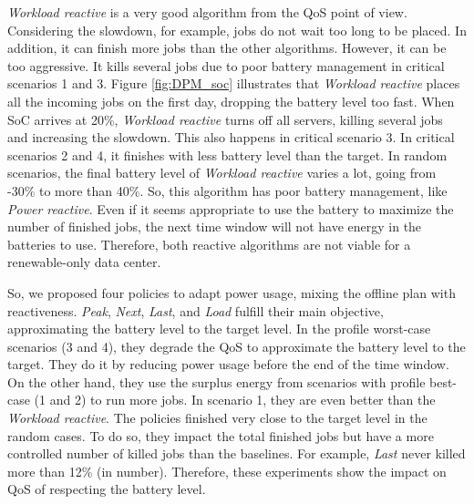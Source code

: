 \emph{Workload reactive} is a very good algorithm from the QoS point of view. Considering the slowdown, for example, jobs do not wait too long to be placed. In addition, it can finish more jobs than the other algorithms. However, it can be too aggressive. It kills several jobs due to poor battery management in critical scenarios 1 and 3. Figure \ref{fig:DPM_soc} illustrates that \emph{Workload reactive} places all the incoming jobs on the first day, dropping the battery level too fast. When SoC arrives at 20\%, \emph{Workload reactive} turns off all servers, killing several jobs and increasing the slowdown. This also happens in critical scenario 3. In critical scenarios 2 and 4, it finishes with less battery level than the target. In random scenarios, the final battery level of \emph{Workload reactive} varies a lot, going from -30\% to more than 40\%. So, this algorithm has poor battery management, like \emph{Power reactive}. Even if it seems appropriate to use the battery to maximize the number of finished jobs, the next time window will not have energy in the batteries to use. Therefore, both reactive algorithms are not viable for a renewable-only data center.

So, we proposed four policies to adapt power usage, mixing the offline plan with reactiveness. \emph{Peak}, \emph{Next}, \emph{Last}, and \emph{Load} fulfill their main objective, approximating the battery level to the target level. In the profile worst-case scenarios (3 and 4), they degrade the QoS to approximate the battery level to the target. They do it by reducing power usage before the end of the time window. On the other hand, they use the surplus energy from scenarios with profile best-case (1 and 2) to run more jobs. In scenario 1, they are even better than the \emph{Workload reactive}. The policies finished very close to the target level in the random cases. To do so, they impact the total finished jobs but have a more controlled number of killed jobs than the baselines. For example, \emph{Last} never killed more than 12\% (in number). Therefore, these experiments show the impact on QoS of respecting the battery level.

